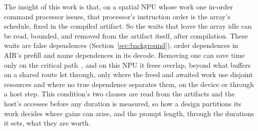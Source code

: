 The insight of this work is that, on a spatial NPU whose work one in-order command processor issues, that processor's instruction order is the array's schedule, fixed in the compiled artifact.
So the waits that leave the array idle can be read, bounded, and removed from the artifact itself, after compilation.
These waits are false dependences (Section~\ref{sec:background}), order dependences in AIR's prefill and name dependences in its decode.
Removing one can save time only on the critical path~\citep{kelley1961critical}, and on this NPU it frees overlap, beyond what buffers on a shared route let through, only where the freed and awaited work use disjoint resources and where no true dependence separates them, on the device or through a host step.
This condition's two clauses are read from the artifacts and the host's accesses before any duration is measured, so how a design partitions its work decides where gains can arise, and the prompt length, through the durations it sets, what they are worth.


